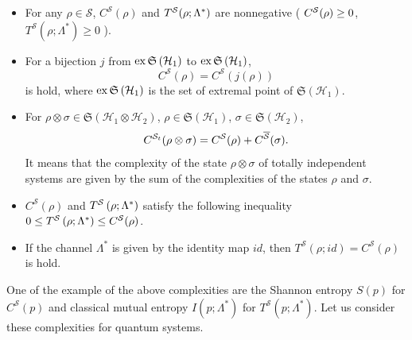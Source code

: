 \begin{itemize}
\item[{(1)}] For any  $  \rho \in \mathcal{S} $,    $  C^{\mathcal{S}}(\rho ) $   and  $  T^{%
\mathcal{S}}( \rho ; \Lambda ^{\ast } )  $   are nonnegative ( $  C^{%
\mathcal{S}}(\rho )\geq 0 $,   \linebreak  $  T^{\mathcal{S}}\left( \rho {;\Lambda ^{\ast }%
}\right) \geq 0 $  ).

\item[{(2)}] For a bijection  $  j $   from  $  \mathop{\rm ex}\mathfrak{S}\left( \mathcal{H}_{1}\right)  $  
to  $  \mathop{\rm ex}\mathfrak{S}\left( \mathcal{H}_{1}\right)  $,   
\[
C^{\mathcal{S}}(\rho )=C^{\mathcal{S}}(j( \rho) ) 
\]%
is hold, where  $  \mathop{\rm ex}\mathfrak{S}\left( \mathcal{H}_{1}\right)  $   is the set of
extremal point of  $  \mathfrak{S}\left( \mathcal{H}_{1}\right)  $.

\item[{(3)}] For  $  \rho \otimes \sigma \in \mathfrak{S}\left( \mathcal{H}_{1}\otimes 
\mathcal{H}_{2}\right)  $,    $  \rho \in \mathfrak{S}\left( \mathcal{H}%
_{1}\right)  $,    $  \sigma \in \mathfrak{S}\left( \mathcal{H}_{2}\right)  $,   
\[
C^{\mathcal{S}_{t}}(\rho \otimes \sigma )=C^{\mathcal{S}}(\rho )+C^{%
\overline{\mathcal{S}}}(\sigma ).
\]%
It means that the complexity of the state  $  \rho \otimes \sigma  $   of totally
independent systems are given by the sum of the complexities of the states  $  %
\rho  $   and  $  \sigma  $.

\item[{(4)}]  $  C^{\mathcal{S}}( \rho)  $   and  $  T^{\mathcal{S}}\left( \rho {%
;\Lambda ^{\ast }}\right)  $   satisfy the following inequality  $  0\leq T^{%
\mathcal{S}}\left( {\rho ;\Lambda ^{\ast }}\right) \leq C^{\mathcal{S}}(\rho
) $.

\item[{(5)}] If the channel  $  {\Lambda ^{\ast }} $   is given by the identity map  $  {id} $,   then  $  T^{\mathcal{S}}\left( {\rho ;id}\right) =C^{\mathcal{S}}({\rho }) $  
is hold.


\end{itemize}

One of the example of the above complexities are the Shannon entropy  $  %
S\left( p\right)  $   for  $  C^{\mathcal{S}}(p) $   and classical mutual entropy  $  %
I\left( p;{\Lambda ^{\ast }}\right)  $   for  $  T^{\mathcal{S}}\left( p{;\Lambda
^{\ast }}\right)  $.   Let us consider these complexities for quantum systems.

